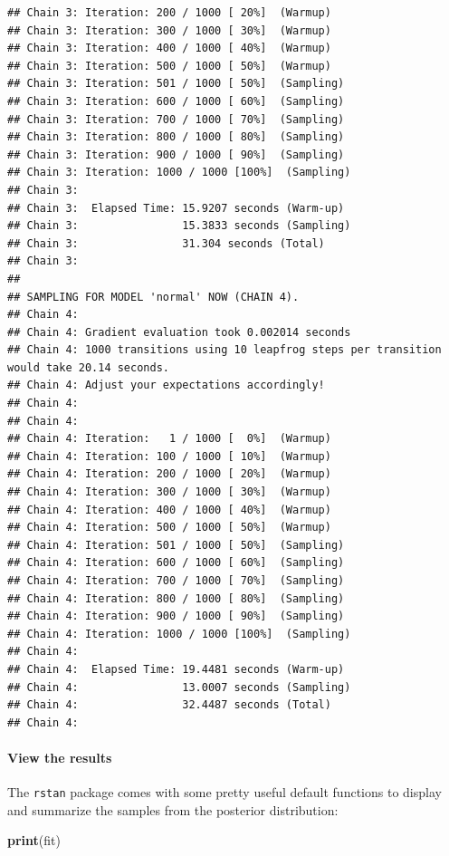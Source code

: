 \documentclass[]{article}
\newenvironment{Shaded}{\begin{snugshade}}{\end{snugshade}}
\newcommand{\KeywordTok}[1]{\textcolor[rgb]{0.13,0.29,0.53}{\textbf{#1}}}
\newcommand{\NormalTok}[1]{#1}
\let\oldparagraph\paragraph
\renewcommand{\paragraph}[1]{\oldparagraph{#1}\mbox{}}
\begin{document}
\begin{verbatim}
## Chain 3: Iteration: 200 / 1000 [ 20%]  (Warmup)
## Chain 3: Iteration: 300 / 1000 [ 30%]  (Warmup)
## Chain 3: Iteration: 400 / 1000 [ 40%]  (Warmup)
## Chain 3: Iteration: 500 / 1000 [ 50%]  (Warmup)
## Chain 3: Iteration: 501 / 1000 [ 50%]  (Sampling)
## Chain 3: Iteration: 600 / 1000 [ 60%]  (Sampling)
## Chain 3: Iteration: 700 / 1000 [ 70%]  (Sampling)
## Chain 3: Iteration: 800 / 1000 [ 80%]  (Sampling)
## Chain 3: Iteration: 900 / 1000 [ 90%]  (Sampling)
## Chain 3: Iteration: 1000 / 1000 [100%]  (Sampling)
## Chain 3: 
## Chain 3:  Elapsed Time: 15.9207 seconds (Warm-up)
## Chain 3:                15.3833 seconds (Sampling)
## Chain 3:                31.304 seconds (Total)
## Chain 3: 
## 
## SAMPLING FOR MODEL 'normal' NOW (CHAIN 4).
## Chain 4: 
## Chain 4: Gradient evaluation took 0.002014 seconds
## Chain 4: 1000 transitions using 10 leapfrog steps per transition would take 20.14 seconds.
## Chain 4: Adjust your expectations accordingly!
## Chain 4: 
## Chain 4: 
## Chain 4: Iteration:   1 / 1000 [  0%]  (Warmup)
## Chain 4: Iteration: 100 / 1000 [ 10%]  (Warmup)
## Chain 4: Iteration: 200 / 1000 [ 20%]  (Warmup)
## Chain 4: Iteration: 300 / 1000 [ 30%]  (Warmup)
## Chain 4: Iteration: 400 / 1000 [ 40%]  (Warmup)
## Chain 4: Iteration: 500 / 1000 [ 50%]  (Warmup)
## Chain 4: Iteration: 501 / 1000 [ 50%]  (Sampling)
## Chain 4: Iteration: 600 / 1000 [ 60%]  (Sampling)
## Chain 4: Iteration: 700 / 1000 [ 70%]  (Sampling)
## Chain 4: Iteration: 800 / 1000 [ 80%]  (Sampling)
## Chain 4: Iteration: 900 / 1000 [ 90%]  (Sampling)
## Chain 4: Iteration: 1000 / 1000 [100%]  (Sampling)
## Chain 4: 
## Chain 4:  Elapsed Time: 19.4481 seconds (Warm-up)
## Chain 4:                13.0007 seconds (Sampling)
## Chain 4:                32.4487 seconds (Total)
## Chain 4:
\end{verbatim}

\paragraph{View the results}\label{view-the-results}

The \texttt{rstan} package comes with some pretty useful default
functions to display and summarize the samples from the posterior
distribution:

\begin{Shaded}
\begin{Highlighting}[]
\KeywordTok{print}\NormalTok{(fit)}
\end{Highlighting}
\end{Shaded}
\end{document}
